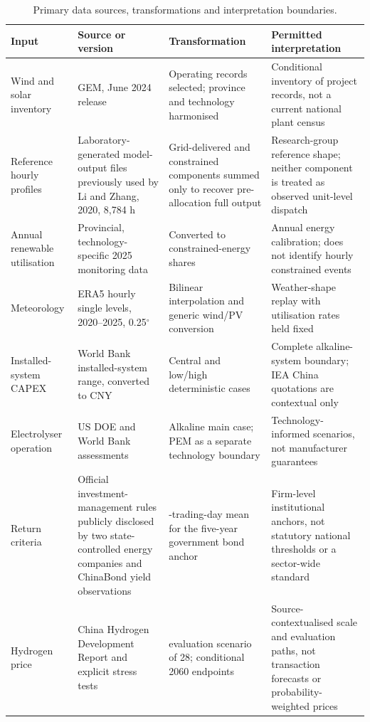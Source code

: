 \documentclass[11pt,a4paper]{article}
\begin{document}
\begin{table}[t]
\caption{Primary data sources, transformations and interpretation boundaries.}\label{tab:data}
\centering
\footnotesize
\begin{tabularx}{\textwidth}{>{\raggedright\arraybackslash}p{}>{\raggedright\arraybackslash}p{}>{\raggedright\arraybackslash}X>{\raggedright\arraybackslash}p{}}
\toprule
Input & Source or version & Transformation & Permitted interpretation \\
\midrule
Wind and solar inventory & GEM, June 2024 release\cite{gem2024} & Operating records selected; province and technology harmonised & Conditional inventory of project records, not a current national plant census \\
Reference hourly profiles & Laboratory-generated model-output files previously used by Li and Zhang, 2020, 8,784 h\cite{li2026} & Grid-delivered and constrained components summed only to recover pre-allocation full output & Research-group reference shape; neither component is treated as observed unit-level dispatch \\
Annual renewable utilisation & Provincial, technology-specific 2025 monitoring data\cite{renewable2025} & Converted to constrained-energy shares & Annual energy calibration; does not identify hourly constrained events \\
Meteorology & ERA5 hourly single levels, 2020--2025, 0.25$^\circ$\cite{hersbach2020,era5data} & Bilinear interpolation and generic wind/PV conversion & Weather-shape replay with utilisation rates held fixed \\
Installed-system CAPEX & World Bank installed-system range, converted to CNY\cite{worldbank2026} & Central and low/high deterministic cases & Complete alkaline-system boundary; IEA China quotations are contextual only\cite{iea2025} \\
Electrolyser operation & US DOE and World Bank assessments\cite{doe2024,worldbank2026} & Alkaline main case; PEM as a separate technology boundary & Technology-informed scenarios, not manufacturer guarantees \\
Return criteria & Official investment-management rules publicly disclosed by two state-controlled energy companies and ChinaBond yield observations\cite{changyuan2026,huadian2025,chinabond2026} & 20-trading-day mean for the five-year government bond anchor & Firm-level institutional anchors, not statutory national thresholds or a sector-wide standard \\
Hydrogen price & China Hydrogen Development Report and explicit stress tests\cite{nea2025hydrogen} & 2026 evaluation scenario of 28; conditional 2060 endpoints & Source-contextualised scale and evaluation paths, not transaction forecasts or probability-weighted prices \\

\end{tabularx}
\end{table}
\end{document}
